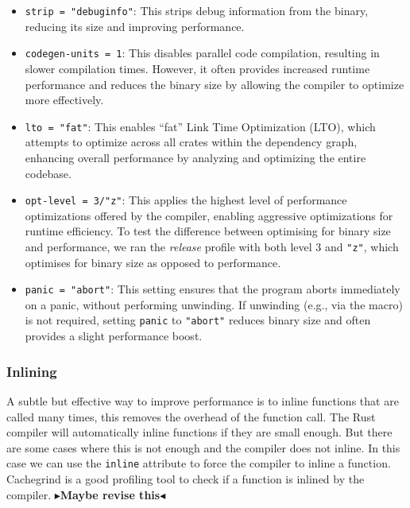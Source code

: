 \documentclass[11pt]{report}
\theoremstyle{definition}
\theoremstyle{plain}
\newcommand{\todo}[1]{{\color[rgb]{.5,0,0}\textbf{$\blacktriangleright$#1$\blacktriangleleft$}}}
\begin{document}
\begin{itemize}
  \item \texttt{strip = "debuginfo"}: This strips debug information from the binary, reducing its size and improving performance.

  \item \texttt{codegen-units = 1}: This disables parallel code compilation, resulting in slower compilation times. However, it often provides increased runtime performance and reduces the binary size by allowing the compiler to optimize more effectively.

  \item \texttt{lto = "fat"}: This enables ``fat'' Link Time Optimization (LTO), which attempts to optimize across all crates within the dependency graph, enhancing overall performance by analyzing and optimizing the entire codebase.

  \item \texttt{opt-level = 3/"z"}: This applies the highest level of performance optimizations offered by the compiler, enabling aggressive optimizations for runtime efficiency. To test the difference between optimising for binary size and performance, we ran the \textit{release} profile with both level 3 and \texttt{"z"}, which optimises for binary size as opposed to performance.

  \item \texttt{panic = "abort"}: This setting ensures that the program aborts immediately on a panic, without performing unwinding. If unwinding (e.g., via the  macro) is not required, setting \texttt{panic} to \texttt{"abort"} reduces binary size and often provides a slight performance boost.
\end{itemize}

\subsubsection{Inlining}
A subtle but effective way to improve performance is to inline functions that are called many times, this removes the overhead of the function call. The Rust compiler will automatically inline functions if they are small enough. But there are some cases where this is not enough and the compiler does not inline. In this case we can use the \texttt{inline} attribute to force the compiler to inline a function. Cachegrind is a good profiling tool to check if a function is inlined by the compiler.
\todo{Maybe revise this}
\end{document}
